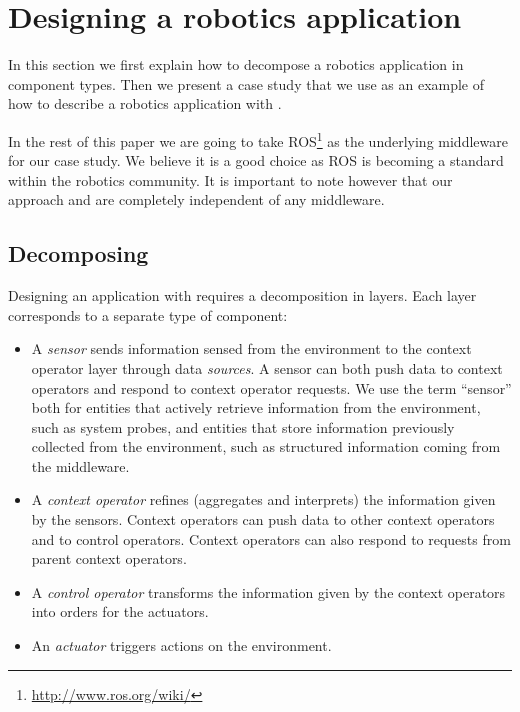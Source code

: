 \section{Designing a robotics application}
\label{sec:designing}

In this section we first explain how to decompose a robotics
application in \diaspec{} component types. Then we present a case
study that we use as an example of how to describe a robotics
application with \diaspec{}.

In the rest of this paper we are going to take
ROS\footnote{\url{http://www.ros.org/wiki/}} as the underlying
middleware for our case study. We believe it is a good choice as ROS
is becoming a standard within the robotics community. It is important
to note however that our approach and \diaspec{} are completely
independent of any middleware.

\subsection{Decomposing}

Designing an application with \diaspec{} requires a decomposition in
layers. Each layer corresponds to a separate type of component:

\begin{itemize}
\item A \emph{sensor} sends information sensed from the environment to
  the context operator layer through data \emph{sources}. A sensor can
  both push data to context operators and respond to context operator
  requests. We use the term ``sensor'' both for entities that actively
  retrieve information from the environment, such as system probes,
  and entities that store information previously collected from the
  environment, such as structured information coming from the
  middleware.
\item A \emph{context operator} refines (aggregates and interprets)
  the information given by the sensors. Context operators can push
  data to other context operators and to control operators. Context
  operators can also respond to requests from parent context
  operators.
\item A \emph{control operator} transforms the information given by
  the context operators into orders for the actuators.
\item An \emph{actuator} triggers actions on the environment.
\end{itemize}

